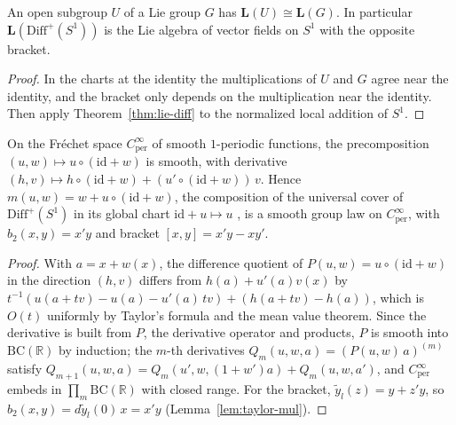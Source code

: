 \begin{corollary}[$\mathbf{L}(\mathrm{Diff}^+(S^1)) = \mathcal{V}(S^1)^{\mathrm{op}}$]
  \label{cor:lie-diff-circle}
  \leanok
  An open subgroup $U$ of a Lie group $G$ has $\mathbf{L}(U) \cong \mathbf{L}(G)$. In particular
  $\mathbf{L}(\mathrm{Diff}^+(S^1))$ is the Lie algebra of vector fields on $S^1$ with the opposite
  bracket.
\end{corollary}

\begin{proof}
  \leanok
  In the charts at the identity the multiplications of $U$ and $G$ agree near the identity, and
  the bracket only depends on the multiplication near the identity. Then apply
  Theorem~\ref{thm:lie-diff} to the normalized local addition of $S^1$.
\end{proof}

\begin{proposition}
  \label{prop:circle-cover}
  \leanok
  On the Fr\'echet space $C^\infty_{\mathrm{per}}$ of smooth $1$-periodic functions, the
  precomposition $(u, w) \mapsto u \circ (\mathrm{id} + w)$ is smooth, with derivative
  $(h, v) \mapsto h \circ (\mathrm{id} + w) + (u' \circ (\mathrm{id} + w))\, v$. Hence
  $m(u, w) = w + u \circ (\mathrm{id} + w)$, the composition of the universal cover of
  $\mathrm{Diff}^+(S^1)$ in its global chart $\mathrm{id} + u \mapsto u$ \cite[\S 13.3]{GN26},
  is a smooth group law on $C^\infty_{\mathrm{per}}$, with $b_2(x, y) = x' y$ and bracket
  $[x, y] = x' y - x y'$.
\end{proposition}

\begin{proof}
  \leanok
  With $a = x + w(x)$, the difference quotient of $P(u, w) = u \circ (\mathrm{id} + w)$ in the
  direction $(h, v)$ differs from $h(a) + u'(a) v(x)$ by
  $t^{-1}(u(a + tv) - u(a) - u'(a)\, t v) + (h(a + tv) - h(a))$, which is $O(t)$ uniformly by
  Taylor's formula and the mean value theorem. Since the derivative is built from $P$, the
  derivative operator and products, $P$ is smooth into $\mathrm{BC}(\mathbb{R})$ by induction; the
  $m$-th derivatives $Q_m(u, w, a) = (P(u, w)\, a)^{(m)}$ satisfy
  $Q_{m+1}(u, w, a) = Q_m(u', w, (1 + w') a) + Q_m(u, w, a')$, and $C^\infty_{\mathrm{per}}$ embeds
  in $\prod_m \mathrm{BC}(\mathbb{R})$ with closed range. For the bracket,
  $\tilde y_l(z) = y + z' y$, so $b_2(x, y) = d\tilde y_l(0)\, x = x' y$
  (Lemma~\ref{lem:taylor-mul}).
\end{proof}

